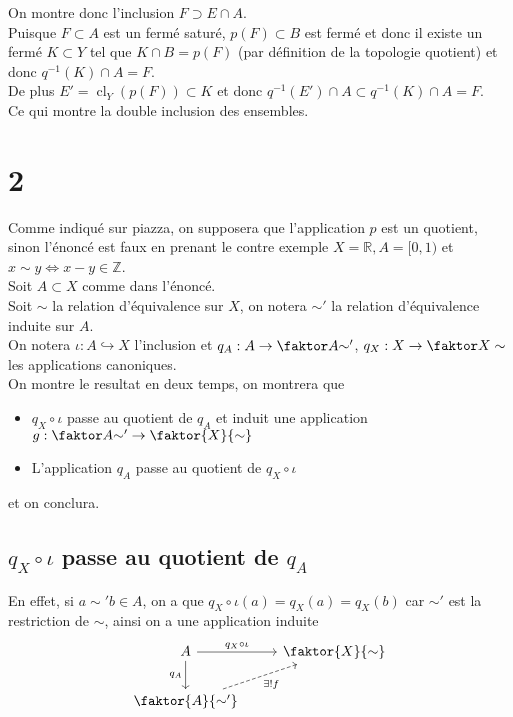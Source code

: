 \documentclass[11pt, a4paper]{article}
\DeclareMathOperator{\cl}{cl}
\begin{document}
On montre donc l'inclusion $F \supset E \cap A$.\\
Puisque $F \subset A$ est un fermé saturé, $p( F) \subset B$ est fermé et donc il existe un fermé $K \subset Y$ tel que $ K \cap B = p( F) $ (par définition de la topologie quotient) et donc $ q^{-1}( K) \cap A = F$.\\
De plus $E' = \cl_Y( p( F) ) \subset K$ et donc $ q^{-1}( E') \cap A \subset q^{-1}( K) \cap A = F$.\\
Ce qui montre la double inclusion des ensembles.\\
\section*{2}
Comme indiqué sur piazza, on supposera que l'application $p$ est un quotient, sinon l'énoncé est faux en prenant le contre exemple $ X = \mathbb{R}, A = [ 0,1) $ et $x\sim y \iff x-y \in \mathbb{Z}$.\\

Soit $A \subset X$ comme dans l'énoncé.\\
Soit $\sim$ la relation d'équivalence sur $X$, on notera $\sim'$ la relation d'équivalence induite sur $A$.\\
On notera $\iota: A \hookrightarrow X$ l'inclusion et  $q_A: A \to \faktor A { \sim' }$, $q_X: X \to \faktor X \sim$ les applications canoniques.\\
On montre le resultat en deux temps, on montrera que
\begin{itemize}
\item $q_X\circ \iota$ passe au quotient de $q_A$ et induit une application $g: \faktor A { \sim' }\to \faktor { X} { \sim} $
\item L'application $q_A$ passe au quotient de $q_X\circ \iota$ 
\end{itemize}
et on conclura.
\subsection*{ $q_X \circ\iota$ passe au quotient de $q_A$ }
En effet, si $ a\sim' b\in A$, on a que $ q_X\circ \iota( a) = q_X( a) = q_X( b)  $ car $\sim'$ est la restriction de $\sim$, ainsi on a une application induite
\[\begin{tikzcd}
	A & {\faktor {X} {\sim}} \\
	{\faktor {A} {\sim'}}
	\arrow["{q_A}"', from=1-1, to=2-1]
	\arrow["{q_X\circ\iota}", from=1-1, to=1-2]
	\arrow["{\exists ! f}"', dashed, from=2-1, to=1-2]
\end{tikzcd}\]
\end{document}
